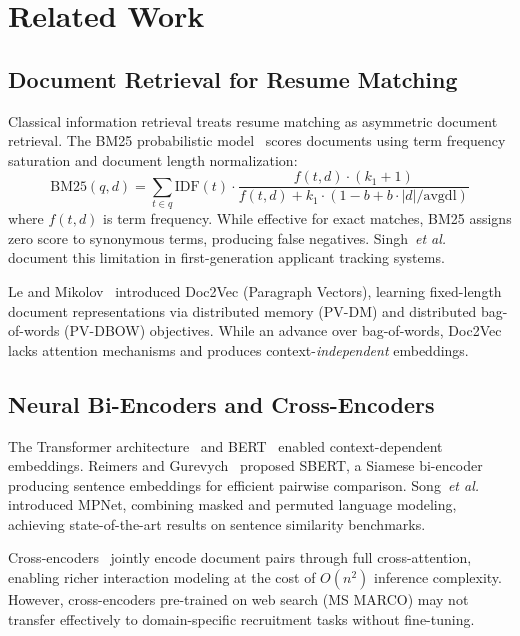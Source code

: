 \documentclass{llncs}
\begin{document}
\section{Related Work}\label{sec:related}

\subsection{Document Retrieval for Resume Matching}

Classical information retrieval treats resume matching as asymmetric document retrieval. The BM25 probabilistic model~\cite{robertson2009probabilistic} scores documents using term frequency saturation and document length normalization:
\begin{equation}
    \text{BM25}(q, d) = \sum_{t \in q} \text{IDF}(t) \cdot \frac{f(t,d) \cdot (k_1 + 1)}{f(t,d) + k_1 \cdot (1 - b + b \cdot |d|/\text{avgdl})}
\end{equation}
where $f(t,d)$ is term frequency. While effective for exact matches, BM25 assigns zero score to synonymous terms, producing false negatives. Singh~\textit{et al.}~\cite{singh2020automated} document this limitation in first-generation applicant tracking systems.

Le and Mikolov~\cite{le2014doc2vec} introduced Doc2Vec (Paragraph Vectors), learning fixed-length document representations via distributed memory (PV-DM) and distributed bag-of-words (PV-DBOW) objectives. While an advance over bag-of-words, Doc2Vec lacks attention mechanisms and produces context-\textit{independent} embeddings.

\subsection{Neural Bi-Encoders and Cross-Encoders}

The Transformer architecture~\cite{vaswani2017attention} and BERT~\cite{devlin2018bert} enabled context-dependent embeddings. Reimers and Gurevych~\cite{reimers2019sbert} proposed SBERT, a Siamese bi-encoder producing sentence embeddings for efficient pairwise comparison. Song~\textit{et al.}~\cite{song2020mpnet} introduced MPNet, combining masked and permuted language modeling, achieving state-of-the-art results on sentence similarity benchmarks.

Cross-encoders~\cite{nogueira2019crossencoder} jointly encode document pairs through full cross-attention, enabling richer interaction modeling at the cost of $O(n^2)$ inference complexity. However, cross-encoders pre-trained on web search (MS MARCO) may not transfer effectively to domain-specific recruitment tasks without fine-tuning.
\end{document}
